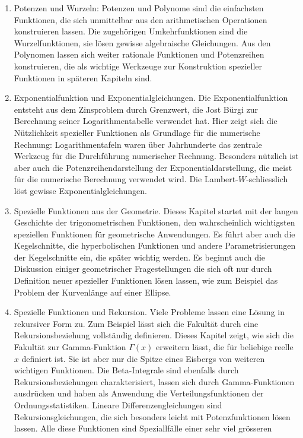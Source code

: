 \begin{enumerate}
\item
Potenzen und Wurzeln: Potenzen und Polynome sind die einfachsten
Funktionen, die sich unmittelbar aus den arithmetischen Operationen
konstruieren lassen.
Die zugehörigen Umkehrfunktionen sind die Wurzelfunktionen,
sie lösen gewisse algebraische Gleichungen.
Aus den Polynomen lassen sich weiter rationale Funktionen und
Potenzreihen konstruieren, die als wichtige Werkzeuge zur Konstruktion
spezieller Funktionen in späteren Kapiteln sind.
\item
Exponentialfunktion und Exponentialgleichungen.
Die Exponentialfunktion entsteht aus dem Zinsproblem durch Grenzwert,
die Jost Bürgi zur Berechnung seiner Logarithmentabelle verwendet hat.
Hier zeigt sich die Nützlichkeit spezieller Funktionen als Grundlage
für die numerische Rechnung: Logarithmentafeln waren über Jahrhunderte
das zentrale Werkzeug für die Durchführung numerischer Rechnung.
Besonders nützlich ist aber auch die Potenzreihendarstellung der
Exponentialdarstellung, die meist für die numerische Berechnung
verwendet wird.
Die Lambert-$W$-schliesslich löst gewisse Exponentialgleichungen.
\item
Spezielle Funktionen aus der Geometrie.
Dieses Kapitel startet mit der langen Geschichte der trigonometrischen
Funktionen, den wahrscheinlich wichtigsten speziellen Funktionen für
geometrische Anwendungen.
Es führt aber auch die Kegelschnitte, die hyperbolischen Funktionen
und andere Parametrisierungen der Kegelschnitte ein, die später
wichtig werden.
Es beginnt auch die Diskussion einiger geometrischer Fragestellungen
die sich oft nur durch Definition neuer spezieller Funktionen lösen
lassen, wie zum Beispiel das Problem der Kurvenlänge auf einer
Ellipse.
\item
Spezielle Funktionen und Rekursion.
Viele Probleme lassen eine Lösung in rekursiver Form zu.
Zum Beispiel lässt sich die Fakultät durch eine Rekursionsbeziehung
vollständig definieren.
Dieses Kapitel zeigt, wie sich die Fakultät zur Gamma-Funktion
$\Gamma(x)$ erweitern lässt, die für beliebige reelle $x$
definiert ist.
Sie ist aber nur die Spitze eines Eisbergs von weiteren wichtigen
Funktionen.
Die Beta-Integrale sind ebenfalls durch Rekursionsbeziehungen
charakterisiert, lassen sich durch Gamma-Funktionen ausdrücken und 
haben als Anwendung die Verteilungsfunktionen der Ordnungsstatistiken.
Lineare Differenzengleichungen sind Rekursionsgleichungen, die sich
besonders leicht mit Potenzfunktionen lösen lassen.
Alle diese Funktionen sind Speziallfälle einer sehr viel grösseren

\end{enumerate}
